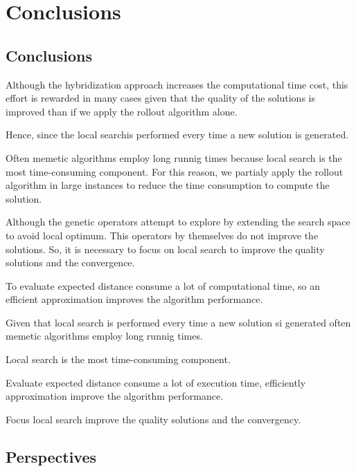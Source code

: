 \chapter{Conclusions}
\label{chap:conclusions}

\section{Conclusions}

Although the hybridization approach increases the computational time cost, this effort is rewarded in many cases given that the quality of the solutions is improved than if we apply the rollout algorithm alone. 

Hence, since the local searchis performed every time a new solution is generated.

Often memetic algorithms employ long runnig times because local search is the most time-consuming component. For this reason, we partialy apply the rollout algorithm in large instances to reduce the time consumption to compute the solution.

Although the genetic operators attempt to explore by extending the search space to avoid local optimum. This operators by themselves do not improve the solutions. So, it is necessary to focus on local search to improve the quality solutions and the convergence.

To evaluate expected distance consume a lot of computational time, so an efficient approximation improves the algorithm performance.

Given that local search is performed every time a new solution si generated often memetic algorithms employ long runnig times. 

Local search is the most time-consuming component.

Evaluate expected distance consume a lot of execution time, efficiently approximation improve the algorithm performance.

Focus local search improve the quality solutions and the convergency.

\section{Perspectives}
